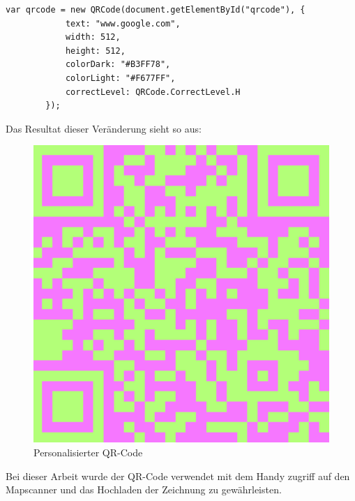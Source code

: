 \begin{lstlisting}[language=html,caption=QR-Code Demo 2,label=lst:tech:gaussianBlur]
    var qrcode = new QRCode(document.getElementById("qrcode"), {
            text: "www.google.com",
            width: 512,
            height: 512,
            colorDark: "#B3FF78",
            colorLight: "#F677FF",
            correctLevel: QRCode.CorrectLevel.H
        });
\end{lstlisting}
Das Resultat dieser Veränderung sieht so aus:
\begin{figure}[H]
    \centering
    \includegraphics[scale=0.7]{pics/fancyQR.png}
    \caption{Personalisierter QR-Code}
    \label{fig:tech:persQR}
\end{figure}

Bei dieser Arbeit wurde der QR-Code verwendet mit dem Handy zugriff auf den Mapscanner und
das Hochladen der Zeichnung zu gewährleisten.

